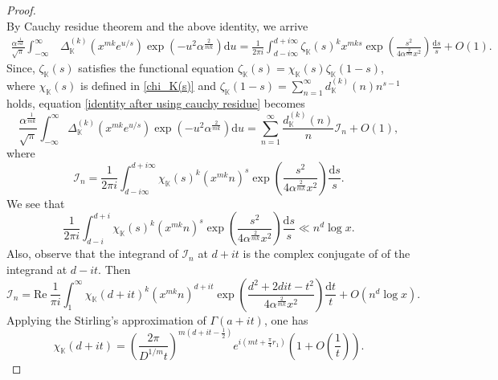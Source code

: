 \documentclass[reqno]{amsart}
\numberwithin{equation}{section}
\theoremstyle{plain}
\begin{document}
\begin{proof}
\begin{equation*}
\end{equation*}
By Cauchy residue theorem and the above identity, we arrive
\begin{align} \label{identity after using cauchy residue}
	\frac{\alpha^{\frac{1}{mk}}}{\sqrt{\pi}}\int_{-\infty}^{\infty}&\Delta_{\mathbb{K}}^{(k)}\left(x^{mk}e^{u/s}\right) \exp\left(-u^2\alpha^{\frac{2}{mk}}\right)\mathrm{d}u = \frac{1}{2\pi i} \int_{d-i\infty}^{d+i\infty} \zeta_{\mathbb{K}}(s)^k x^{mks} \exp\left( \frac{s^2}{4\alpha^{\frac{2}{mk}}x^2}\right) \frac{\mathrm{d}s}{s} +O(1).
\end{align}
Since, $\zeta_{\mathbb{K}}(s)$ satisfies the functional equation $\zeta_{\mathbb{K}}(s)= \chi_{\mathbb{K}}(s) \zeta_{\mathbb{K}}(1-s)$, where $\chi_{\mathbb{K}}(s)$ is defined in \eqref{chi_K(s)} and $\zeta_{\mathbb{K}}(1-s) =\sum_{n=1}^{\infty} d_\mathbb{K}^{(k)}(n)n^{s-1}$ holds,  equation \eqref{identity after using cauchy residue} becomes
\begin{equation} \label{Infinite sum times I_n}
\frac{\alpha^{\frac{1}{mk}}}{\sqrt{\pi}}\int_{-\infty}^{\infty}\Delta_{\mathbb{K}}^{(k)}\left(x^{mk}e^{u/s}\right) \exp\left(-u^2\alpha^{\frac{2}{mk}}\right)\mathrm{d}u=	\sum_{n=1}^{\infty} \frac{d_{\mathbb{K}}^{(k)}(n)}{n} \mathcal{I}_n +O(1),
\end{equation}
where
\begin{equation*}
	\mathcal{I}_n = \frac{1}{2\pi i} \int_{d-i\infty}^{d+i \infty} \chi_{\mathbb{K}}(s)^k \left(x^{mk}n\right)^s \exp\left(\frac{s^2}{4\alpha^{\frac{2}{mk}}x^2}\right)\frac{\mathrm{d}s}{s}.
\end{equation*}
We see that 
\begin{equation*}
	\frac{1}{2\pi i}\int_{d-i}^{d+i} \chi_{\mathbb{K}}(s)^k \left(x^{mk}n\right)^s \exp\left(\frac{s^2}{4\alpha^{\frac{2}{mk}}x^2}\right)\frac{\mathrm{d}s}{s} \ll n^d \log x.
\end{equation*}
Also, observe that the integrand of $\mathcal{I}_n$ at $d+it$ is the complex conjugate of of the integrand at $d-it$. Then
\begin{equation*}
	\mathcal{I}_n = \text{Re} \ \frac{1}{\pi i} \int_{1}^{\infty} \chi_{\mathbb{K}}(d+it)^k \left(x^{mk} n\right)^{d+it} \exp\left(\frac{d^2+2dit-t^2}{4\alpha^{\frac{2}{mk}}x^2}\right) \frac{\mathrm{d}t}{t} + O\left(n^d \log x\right).
\end{equation*}
Applying the Stirling's approximation of $\Gamma(a+it)$, one has 
\begin{equation*}
	\chi_{\mathbb{K}}(d+it) = \left(\frac{2\pi}{D^{1/m}t}\right)^{m\left(d+it-\frac{1}{2}\right)} e^{i\left(mt+\frac{\pi}{4}r_1\right)}\left(1+O\left(\frac{1}{t}\right)\right).

\end{equation*}
\end{proof}
\end{document}
